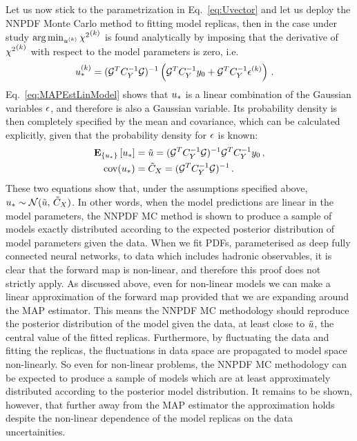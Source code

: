 Let us now stick to the parametrization in Eq.~\ref{eq:Uvector} and let us
deploy the NNPDF Monte Carlo method to fitting model replicas, then in the case
under study $\arg\min_{u^{(k)}} {\chi^2}^{(k)}$ is found analytically by
imposing that the derivative of ${\chi^2}^{(k)}$ with respect to the model parameters
is zero, i.e.
\begin{equation}
    \begin{split}
        \label{eq:MAPEstLinModel}
        u_*^{(k)} &= (\mathcal{G}^T C_{Y}^{-1} \mathcal{G})^{-1}
        \left(
            \mathcal{G}^T C_{Y}^{-1} y_0 +
            \mathcal{G}^T C_{Y}^{-1} \epsilon^{(k)}
        \right) \, .
    \end{split}
\end{equation}
Eq.~\ref{eq:MAPEstLinModel} shows that $u_*$ is a linear combination of
the Gaussian variables $\epsilon$, and therefore is also a Gaussian variable. Its
probability density is then completely specified by the mean and covariance,
which can be calculated explicitly, given that the probability density for
$\epsilon$ is known:
\begin{align}
    \mathbf{E}_{\{ u_* \}} \left[ u_* \right] &=
    \tilde{u} = (\mathcal{G}^T C_{Y}^{-1} \mathcal{G})^{-1} \mathcal{G}^T
    C_{Y}^{-1} y_0\, , \\
    {\rm cov}(u_*) &= \tilde{C}_X = (\mathcal{G}^T C_{Y}^{-1} \mathcal{G})^{-1} \, .
\end{align}
These two equations show that, under the assumptions specified above,
$u_* \sim \mathcal{N}(\tilde{u}, \, \tilde{C}_X)$. In other
words, when the model predictions are linear in the model parameters, the NNPDF
MC method is shown to produce a sample of models exactly distributed according
to the expected posterior distribution of model parameters given the data. When
we fit PDFs, parameterised as deep fully connected neural networks, to data
which includes hadronic observables, it is clear that the forward map is
non-linear, and therefore this proof does not strictly apply. As discussed
above, even for non-linear models we can make a linear approximation of the
forward map provided that we are expanding around the MAP estimator. This means
the NNPDF MC methodology should reproduce the posterior distribution of the
model given the data, at least close to $\tilde{u}$, the central value of
the fitted replicas. Furthermore, by fluctuating the data and fitting the
replicas, the fluctuations in data space are propagated to model space
non-linearly. So even for non-linear problems, the NNPDF MC methodology can be
expected to produce a sample of models which are at least approximately
distributed according to the posterior model distribution. It remains to be
shown, however, that further away from the MAP estimator the approximation holds
despite the non-linear dependence of the model replicas on the data
uncertainities.

